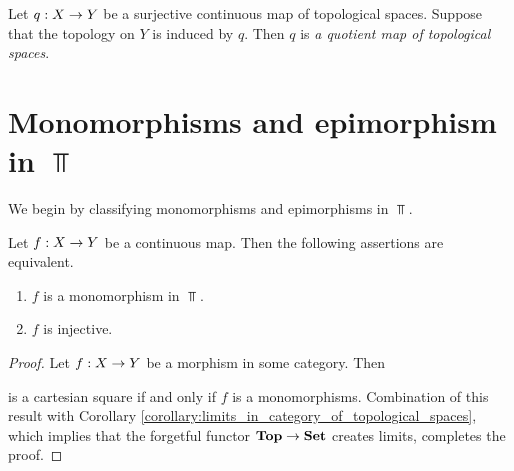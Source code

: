 \begin{definition}
	Let $q:X \rightarrow Y$ be a surjective continuous map of topological spaces. Suppose that the topology on $Y$ is induced by $q$. Then $q$ is \textit{a quotient map of topological spaces}.
\end{definition}

\section{Monomorphisms and epimorphism in $\Top$}
\noindent
We begin by classifying monomorphisms and epimorphisms in $\Top$.

\begin{proposition}\label{proposition:monomorphisms_in_topological_spaces}
	Let $f:X\rightarrow Y$ be a continuous map. Then the following assertions are equivalent.
	\begin{enumerate}[label=\emph{\textbf{(\roman*)}}, leftmargin=3.0em]
		\item $f$ is a monomorphism in $\Top$.
		\item $f$ is injective.
	\end{enumerate}
\end{proposition}
\begin{proof}
	Let $f:X\rightarrow Y$ be a morphism in some category. Then
	\begin{center}
	\end{center}
	is a cartesian square if and only if $f$ is a monomorphisms. Combination of this result with Corollary \ref{corollary:limits_in_category_of_topological_spaces}, which implies that the forgetful functor $\mathbf{Top} \rightarrow \mathbf{Set}$ creates limits, completes the proof.
\end{proof}

